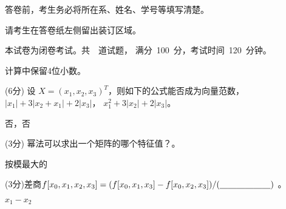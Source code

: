 \documentclass[12pt,letter]{ustcexam}
\renewcommand{\biaoti}[1]{\begin{spacing}{1.3}\begin{center}\Large\zihao{2}
                          #1\end{center}\end{spacing}\medskip}
\begin{document}
\begin{CJK*}{UTF8}{song}
\CJKindent \CJKtilde %
\mifengxian

\MaketitleB   %
\Makedefen

\vspace{1em}
\begin{notice}
\item 答卷前，考生务必将所在系、姓名、学号等填写清楚。
\item 请考生在答卷纸左侧留出装订区域。
\item 本试卷为闭卷考试。共~\numquestions{}~道试题，
      满分~100~分，考试时间~120~分钟。
\item 计算中保留4位小数。
\end{notice}

\begin{problems}
\qu (6分) 设 $X=(x_1,x_2,x_3)^T$，则如下的公式能否成为向量范数， \\
$|x_1|+3|x_2+x_1|+2|x_3|$\twob\oneb ，
$x_1^2+3|x_2|+2|x_3|$\twob\oneb 。
\begin{sol}
 否，否
\end{sol}

\qu (3分) 幂法可以求出一个矩阵的哪个特征值？\sixb 。
\begin{sol}
按模最大的 
\end{sol}

\qu (3分)差商$f[x_0,x_1,x_2,x_3]=(f[x_0,x_1,x_3]-f[x_0,x_2,x_3])/(\underline{\hspace{1em}}\hspace{0.001em}\underline{\hspace{1em}}\hspace{0.001em}\underline{\hspace{1em}}\hspace{0.001em}\underline{\hspace{1em}}\hspace{0.001em}\underline{\hspace{1em}}\hspace{0.001em}\underline{\hspace{1em}}\hspace{0.001em})$ 。~
\begin{sol}
 $x_1-x_2$
\end{sol}


\end{problems}
\end{CJK*}
\end{document}
